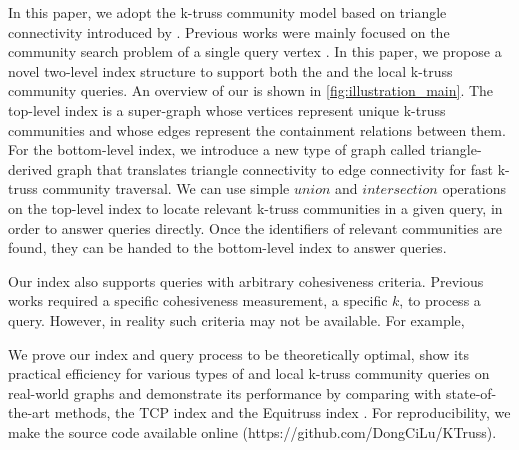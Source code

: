 In this paper, we adopt the k-truss community model based on triangle connectivity introduced by \cite{huang2014querying}.
Previous works were mainly focused on the community search problem of a single query vertex \cite{huang2014querying, akbas2017truss}. In this paper, we propose a novel two-level index structure to support both the \toplevelprob{} and the \bottomlevelprob{} local k-truss community queries. An overview of our \twolevelindex{} is shown in \autoref{fig:illustration_main}. The top-level index is a super-graph whose vertices represent unique k-truss communities and whose edges represent the containment relations between them. For the bottom-level index, we introduce a new type of graph called triangle-derived graph that translates triangle connectivity to edge connectivity for fast k-truss community traversal. We can use simple $union$ and $intersection$ operations on the top-level index to locate relevant k-truss communities in a given query, in order to answer \toplevelprob{} queries directly. Once the identifiers of relevant communities are found, they can be handed to the bottom-level index to answer \bottomlevelprob{} queries.

Our index also supports queries with arbitrary cohesiveness criteria. Previous works required a specific cohesiveness measurement, \eg a specific $k$, to process a query. However, in reality such criteria may not be available. For example, 

We prove our index and query process to be theoretically optimal, show its practical efficiency for various types of \toplevelprob{} and \bottomlevelprob{} local k-truss community queries on real-world graphs and demonstrate its performance by comparing with state-of-the-art methods, the TCP index \cite{huang2014querying} and the Equitruss index \cite{akbas2017truss}. For reproducibility, we make the source code available online (https://github.com/DongCiLu/KTruss).

